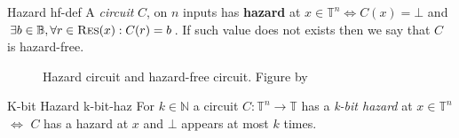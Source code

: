 \begin{definitionbox}{Hazard \cite{ikenmeyer_ComplexityHazardfreeCircuits_2019, eichelberger_HazardDetectionCombinational_1965}}{hf-def}
    A \textit{circuit} $C$, on $n$ inputs has \textbf{hazard} at $x \in \mathbb{T}^n \iff C(x) = \bot$
    and $\exists b \in \mathbb{B}, \forall r \in \textnormal{\textsc{Res}}(x): C(r) = b$. If such value does not exists
    then we say that $C$ is hazard-free.
\end{definitionbox}

\begin{figure}[h!]
    \centering
    \caption{Hazard circuit and hazard-free circuit. Figure by \cite{ikenmeyer_ComplexityHazardfreeCircuits_2019}}\label{fig:hazard-example}
\end{figure}

\begin{definitionbox}{K-bit Hazard \cite{ikenmeyer_ComplexityHazardfreeCircuits_2019}}{k-bit-haz}
    For $k \in \mathbb{N}$ a circuit $C: \mathbb{T}^n \to \mathbb{T}$ has a \textit{k-bit hazard} at $x \in \mathbb{T}^n$
    $\iff$ $C$ has a hazard at $x$ and $\bot$ appears at most $k$ times.
\end{definitionbox}
%
%
%
